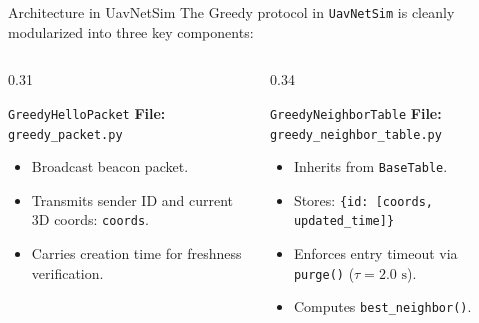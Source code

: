 \documentclass[aspectratio=169,10pt]{beamer}
\begin{document}
\begin{frame}{Architecture in UavNetSim}
  The Greedy protocol in \texttt{UavNetSim} is cleanly modularized into three key components:

  \vspace{0.5em}
  \begin{columns}[T]
    \begin{column}{0.31\textwidth}
      \begin{block}{\texttt{GreedyHelloPacket}}
        \scriptsize
        \textbf{File:} \texttt{greedy\_packet.py}
        \begin{itemize}\setlength{\itemsep}{0.3em}
          \item Broadcast beacon packet.
          \item Transmits sender ID and current 3D coords: \texttt{coords}.
          \item Carries creation time for freshness verification.
        \end{itemize}
      \end{block}
    \end{column}

    \begin{column}{0.34\textwidth}
      \begin{block}{\texttt{GreedyNeighborTable}}
        \scriptsize
        \textbf{File:} \texttt{greedy\_neighbor\_table.py}
        \begin{itemize}\setlength{\itemsep}{0.3em}
          \item Inherits from \texttt{BaseTable}.
          \item Stores: \newline \texttt{\{id: [coords, updated\_time]\}}
          \item Enforces entry timeout via \texttt{purge()} ($\tau = 2.0\text{ s}$).
          \item Computes \texttt{best\_neighbor()}.
        \end{itemize}
      \end{block}
    \end{column}


\end{columns}
\end{frame}
\end{document}
